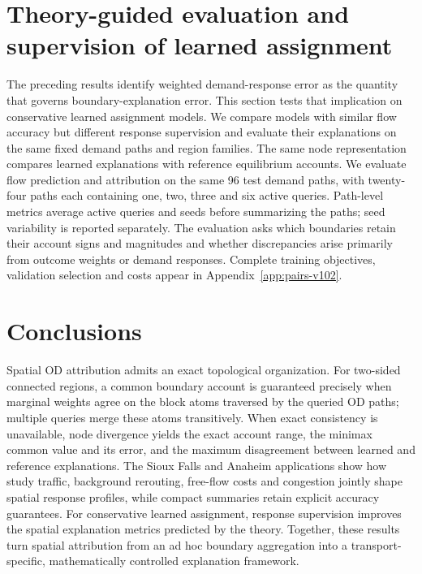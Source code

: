 \documentclass[a4paper,fleqn]{cas-sc}
\begin{document}



\FloatBarrier
\section{Theory-guided evaluation and supervision of learned assignment}\label{sec:pairresults}
The preceding results identify weighted demand-response error as the
quantity that governs boundary-explanation error. This section tests
that implication on conservative learned assignment models. We compare
models with similar flow accuracy but different response supervision
and evaluate their explanations on the same fixed demand paths and
region families. The same node representation compares learned
explanations with reference equilibrium accounts. We evaluate flow
prediction and attribution on the same 96 test demand paths, with
twenty-four paths each containing one, two, three and six active queries.
Path-level metrics average active queries and seeds before summarizing
the paths; seed variability is reported separately. The evaluation asks
which boundaries retain their account signs and magnitudes and whether
discrepancies arise primarily from outcome weights or demand responses.
Complete training objectives, validation selection and costs appear in
Appendix~\ref{app:pairs-v102}.


\section{Conclusions}\label{sec:conclusions}
Spatial OD attribution admits an exact topological organization. For
two-sided connected regions, a common boundary account is guaranteed
precisely when marginal weights agree on the block atoms traversed by
the queried OD paths; multiple queries merge these atoms transitively.
When exact consistency is unavailable, node divergence yields the exact
account range, the minimax common value and its error, and the maximum
disagreement between learned and reference explanations. The Sioux Falls
and Anaheim applications show how study traffic, background rerouting,
free-flow costs and congestion jointly shape spatial response profiles,
while compact summaries retain explicit accuracy guarantees. For
conservative learned assignment, response supervision improves the
spatial explanation metrics predicted by the theory. Together, these
results turn spatial attribution from an ad hoc boundary aggregation
into a transport-specific, mathematically controlled explanation
framework.
\end{document}
